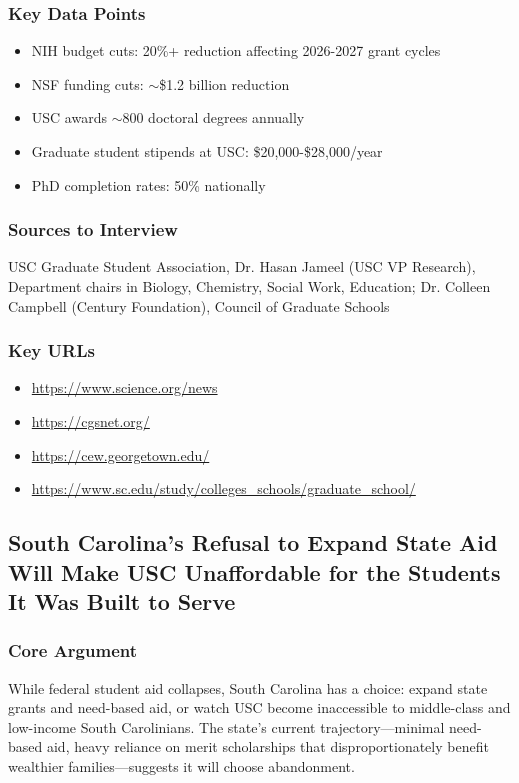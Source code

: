 \documentclass[11pt,letterpaper]{article}
\begin{document}
\subsubsection*{Key Data Points}
\begin{itemize}[noitemsep]
    \item NIH budget cuts: 20\%+ reduction affecting 2026-2027 grant cycles
    \item NSF funding cuts: $\sim$\$1.2 billion reduction
    \item USC awards $\sim$800 doctoral degrees annually
    \item Graduate student stipends at USC: \$20,000-\$28,000/year
    \item PhD completion rates: 50\% nationally
\end{itemize}

\subsubsection*{Sources to Interview}
USC Graduate Student Association, Dr. Hasan Jameel (USC VP Research), Department chairs in Biology, Chemistry, Social Work, Education; Dr. Colleen Campbell (Century Foundation), Council of Graduate Schools

\subsubsection*{Key URLs}
\begin{itemize}[noitemsep]
    \item \url{https://www.science.org/news}
    \item \url{https://cgsnet.org/}
    \item \url{https://cew.georgetown.edu/}
    \item \url{https://www.sc.edu/study/colleges_schools/graduate_school/}
\end{itemize}

\newpage
\subsection{South Carolina's Refusal to Expand State Aid Will Make USC Unaffordable for the Students It Was Built to Serve}

\subsubsection*{Core Argument}
While federal student aid collapses, South Carolina has a choice: expand state grants and need-based aid, or watch USC become inaccessible to middle-class and low-income South Carolinians. The state's current trajectory---minimal need-based aid, heavy reliance on merit scholarships that disproportionately benefit wealthier families---suggests it will choose abandonment.
\end{document}
